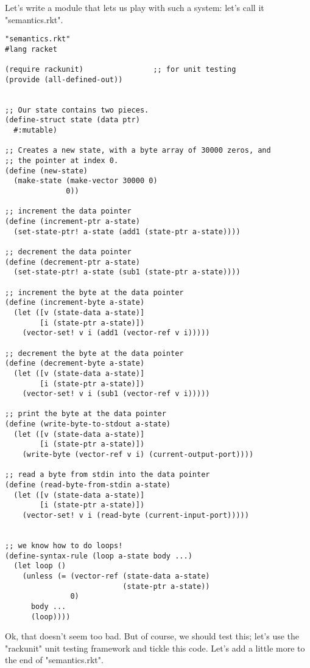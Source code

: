 \documentclass{article}
\begin{document}
Let's write a module that lets us play with such a system: let's call it "semantics.rkt".
\begin{verbatim}
"semantics.rkt"
#lang racket
 
(require rackunit)                ;; for unit testing
(provide (all-defined-out))
 
 
;; Our state contains two pieces.
(define-struct state (data ptr)
  #:mutable)
 
;; Creates a new state, with a byte array of 30000 zeros, and
;; the pointer at index 0.
(define (new-state)
  (make-state (make-vector 30000 0)
              0))
 
;; increment the data pointer
(define (increment-ptr a-state)
  (set-state-ptr! a-state (add1 (state-ptr a-state))))
 
;; decrement the data pointer
(define (decrement-ptr a-state)
  (set-state-ptr! a-state (sub1 (state-ptr a-state))))
 
;; increment the byte at the data pointer
(define (increment-byte a-state)
  (let ([v (state-data a-state)]
        [i (state-ptr a-state)])
    (vector-set! v i (add1 (vector-ref v i)))))
 
;; decrement the byte at the data pointer
(define (decrement-byte a-state)
  (let ([v (state-data a-state)]
        [i (state-ptr a-state)])
    (vector-set! v i (sub1 (vector-ref v i)))))
 
;; print the byte at the data pointer
(define (write-byte-to-stdout a-state)
  (let ([v (state-data a-state)]
        [i (state-ptr a-state)])
    (write-byte (vector-ref v i) (current-output-port))))
 
;; read a byte from stdin into the data pointer
(define (read-byte-from-stdin a-state)
  (let ([v (state-data a-state)]
        [i (state-ptr a-state)])
    (vector-set! v i (read-byte (current-input-port)))))
 
 
;; we know how to do loops!
(define-syntax-rule (loop a-state body ...)
  (let loop ()
    (unless (= (vector-ref (state-data a-state)
                           (state-ptr a-state))
               0)
      body ...
      (loop))))
\end{verbatim}
Ok, that doesn't seem too bad. But of course, we should test this; let's use the "rackunit" unit testing framework and tickle this code. Let's add a little more to the end of "semantics.rkt".
\end{document}
